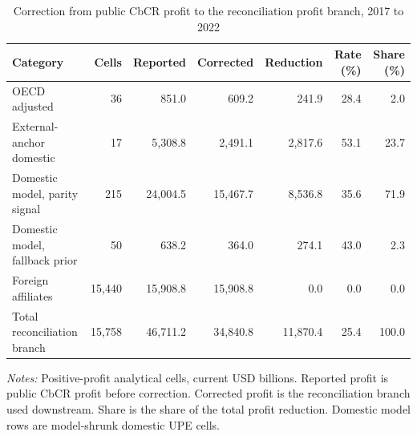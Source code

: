 \begin{table}[H]
\centering
\scriptsize
\setlength{\tabcolsep}{4pt}
\caption[Profit-base correction]{Correction from public CbCR profit to the reconciliation profit branch, 2017 to 2022}
\label{tab:profit_correction_effects}
\begin{tabularx}{\textwidth}{@{}>{\raggedright\arraybackslash}Xrrrrrr@{}}
\toprule
Category & Cells & Reported & Corrected & Reduction & Rate (\%) & Share (\%) \\
\midrule
OECD adjusted &     36 &    851.0 &    609.2 &    241.9 & 28.4 &   2.0 \\
External-anchor domestic &     17 &  5,308.8 &  2,491.1 &  2,817.6 & 53.1 &  23.7 \\
Domestic model, parity signal &    215 & 24,004.5 & 15,467.7 &  8,536.8 & 35.6 &  71.9 \\
Domestic model, fallback prior &     50 &    638.2 &    364.0 &    274.1 & 43.0 &   2.3 \\
Foreign affiliates & 15,440 & 15,908.8 & 15,908.8 &      0.0 &  0.0 &   0.0 \\
\midrule
Total reconciliation branch & 15,758 & 46,711.2 & 34,840.8 & 11,870.4 & 25.4 & 100.0 \\
\bottomrule
\end{tabularx}

\vspace{0.5em}
\begin{minipage}{0.96\textwidth}
\footnotesize\raggedright \textit{Notes:} Positive-profit analytical cells, current USD billions. Reported profit is public CbCR profit before correction. Corrected profit is the reconciliation branch used downstream. Share is the share of the total profit reduction. Domestic model rows are model-shrunk domestic UPE cells.
\end{minipage}
\end{table}
